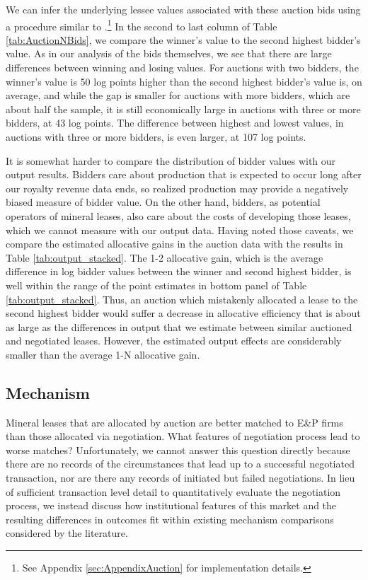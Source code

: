 We can infer the underlying lessee values associated with these auction bids using a procedure similar to \cite{roberts2013unobserved}.\footnote{See Appendix \ref{sec:AppendixAuction} for implementation details.}  In the second to last column of Table \ref{tab:AuctionNBids}, we compare the winner's value to the second highest bidder's value.  As in our analysis of the bids themselves, we see that there are large differences between winning and losing values. For auctions with two bidders, the winner's value is 50 log points higher than the second highest bidder's value is, on average, and while the gap is smaller for auctions with more bidders, which are about half the sample, it is still economically large in auctions with three or more bidders, at 43 log points.  The difference between highest and lowest values, in auctions with three or more bidders, is even larger, at 107 log points.

It is somewhat harder to compare the distribution of bidder values with our output results. Bidders care about production that is expected to occur long after our royalty revenue data ends, so realized production may provide a negatively biased measure of bidder value.  On the other hand, bidders, as potential operators of mineral leases, also care about the costs of developing those leases, which we cannot measure with our output data.  Having noted those caveats, we compare the estimated allocative gains in the auction data with the results in Table \ref{tab:output_stacked}.  The 1-2 allocative gain, which is the average difference in log bidder values between the winner and second highest bidder, is well within the range of the point estimates in bottom panel of Table \ref{tab:output_stacked}.  Thus, an auction which mistakenly allocated a lease to the second highest bidder would suffer a decrease in allocative efficiency that is about as large as the differences in output that we estimate between similar auctioned and negotiated leases. However, the estimated output effects are considerably smaller than the average 1-N allocative gain.  

\addtolength{\tabcolsep}{10pt}

\subsection{Mechanism}

Mineral leases that are allocated by auction are better matched to E\&P firms than those allocated via negotiation. What features of negotiation process lead to worse matches? Unfortunately, we cannot answer this question directly because there are no records of the circumstances that lead up to a successful negotiated transaction, nor are there any records of initiated but failed negotiations. In lieu of sufficient transaction level detail to quantitatively evaluate the negotiation process, we instead discuss how institutional features of this market and the resulting differences in outcomes fit within existing mechanism comparisons considered by the literature.  

